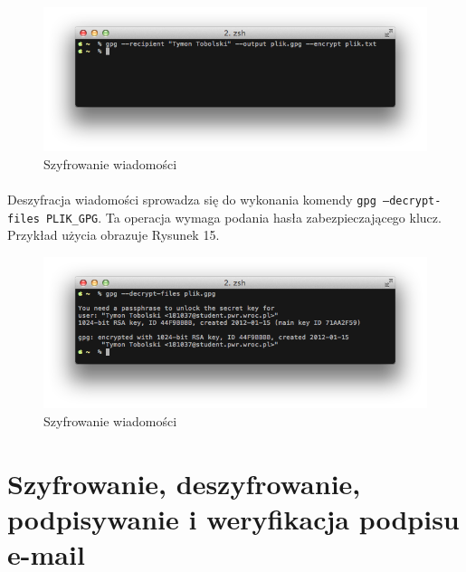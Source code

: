 \documentclass[wide,a4paper,titlepage,12pt] {article}
\begin{document}
  \begin{figure}[h!]
    \begin{center}
      \includegraphics[width=\textwidth]{img/14.png}
      \caption{Szyfrowanie wiadomości}
    \end{center}
  \end{figure}

  \paragraph{}
  Deszyfracja wiadomości sprowadza się do wykonania komendy \texttt{gpg --decrypt-files PLIK\_GPG}. Ta operacja wymaga podania hasła zabezpieczającego klucz. Przykład użycia obrazuje Rysunek 15.

  \begin{figure}[h!]
    \begin{center}
      \includegraphics[width=\textwidth]{img/15.png}
      \caption{Szyfrowanie wiadomości}
    \end{center}
  \end{figure}

  \newpage
  \paragraph{}
  \newpage


  \section{Szyfrowanie, deszyfrowanie, podpisywanie i weryfikacja podpisu e-mail}
\end{document}
